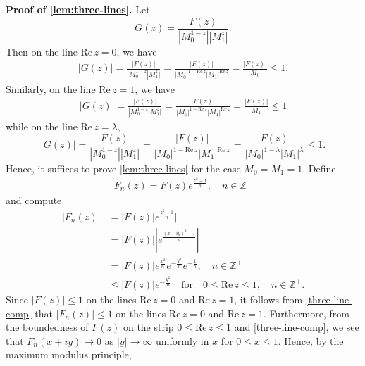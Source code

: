 \documentclass[12pt,reqno]{amsart}
\numberwithin{equation}{section}  %
\numberwithin{figure}{section}
\newcommand{\zz}{\mathbb{Z}}
\theoremstyle{plain}
\theoremstyle{definition}
\theoremstyle{remark}
\begin{document}
%
%
{\bf Proof of \autoref{lem:three-lines}.} Let $$G(z) = \frac{F(z)}{| M_0^{1-z} | |M_1^z |}.$$ Then on the
line $\text{Re}\, z =0$, we have
%
%
\begin{equation*}
\begin{split}
	| G(z) | = \frac{| F(z) |}{| M_0^{1-z} | M_1^z |} = \frac{| F(z) |}{|
	M_0|^{1-\text{Re}\, z}  |M_1|^{\text{Re}\, z}} = \frac{| F(z) |}{M_0} \le 1.
\end{split}
\end{equation*}
%
%
Similarly, on the line $\text{Re}\, z=1$, we have
\begin{equation*}
\begin{split}
	| G(z) | = \frac{| F(z) |}{| M_0^{1-z} | M_1^z |} = \frac{| F(z) |}{|
	M_0|^{1-\text{Re}\, z}  |M_1|^{\text{Re}\, z}} = \frac{| F(z) |}{M_1} \le 1
\end{split}
\end{equation*}
while on
the line $\text{Re}\, z=\lambda$, $$| G(z) | = \frac{| F(z) |}{| M_0^{1-z} |
|M_1^{z}
|} = \frac{| F(z) |}{| M_0|^{1-\text{Re}\, z}  |M_1|^{\text{Re}\, z}} 
= \frac{| F(z) |}{| M_0|^{1-\lambda}  |M_1|^{\lambda}}  \le 1.$$
%
%
Hence, it suffices to prove \autoref{lem:three-lines} for the case $M_0 = M_1 =
1$. Define 
%
%
\begin{equation*}
\begin{split}
	F_n(z) = F(z) e^{\frac{z^2 -1}{n}}, \quad n \in \zz^+
\end{split}
\end{equation*}
and compute
%
%
\begin{equation}
\label{three-line-comp}
\begin{split}
	| F_n(z) |
	& = | F(z) | e^{\frac{z^{2}-1}{n}} |
	\\
	& = | F(z) | |e^{\frac{(x+iy)^2 -1}{n}}|
	\\
	& = | F(z) |  e^{\frac{x^2}{n}}e^{-\frac{y^2}{n}}e^{-\frac{1}{n}}, \quad n
	\in \zz^+
	\\
	& \le | F(z) |e^{-\frac{y^2}{n}} \quad \text{for} \quad 0 \le \text{Re}\,z \le
	1, \quad n \in \zz^+.
\end{split}
\end{equation}
%
%
Since $| F(z) | \le 1$ on the lines $\text{Re}\, z =0$ and $\text{Re}\, z =1$,
it follows from \eqref{three-line-comp} that $| F_n(z) | \le 1$ on the lines 
$\text{Re}\, z =0$ and $\text{Re}\, z =1$. Furthermore, from the boundedness of
$F(z)$ on the strip $0 \le \text{Re}\, z \le 1$ and \eqref{three-line-comp}, we
see that $F_n(x + iy) \to 0$ as $|y| \to \infty$
uniformly in $x$ for $0 \le x \le 1$. Hence, by the maximum modulus principle,
\end{document}
